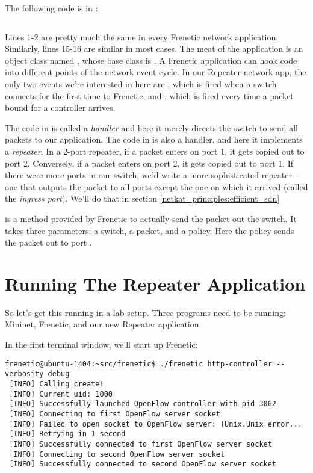 The following code is in :

\inputminted[linenos]{python}{code/quick_start/repeater.py}

Lines 1-2 are pretty much the same in every Frenetic network application.
Similarly, lines 15-16 are similar in most cases. 
 The meat of the application is an object class named , whose base class is .
A Frenetic application can hook code into different points of the network event cycle.
In our Repeater network app, the only two events we're interested in here are
, which is fired when a switch connects for the first time to Frenetic, and 
 , which is fired every time a packet
bound for a controller arrives.

The code in  is called a \emph{handler} and here it 
merely directs the switch to send all packets to our application.
The code in  is also a handler, and here it implements a {\it repeater}.
In a 2-port repeater, if a packet enters on port 1, it gets copied out to port 2.  
Conversely, if a packet enters on port 2, it gets copied out to port 1.
If there were more ports in our switch, we'd write a more sophisticated repeater -- one that
outputs the packet to all ports except the one on which it arrived (called the {\it ingress port}). 
We'll do that in section \ref{netkat_principles:efficient_sdn} 

 is a method provided by Frenetic to actually send the packet out the switch.  It takes three 
parameters: a switch, a packet, and a policy.  
Here the policy sends the packet out to port .   

\section{Running The Repeater Application}

So let's get this running in a lab setup.  
Three programs need to be running:  Mininet, Frenetic, and our new Repeater application.  

In the first terminal window, we'll start up Frenetic:

\begin{verbatim}
frenetic@ubuntu-1404:~src/frenetic$ ./frenetic http-controller --verbosity debug
 [INFO] Calling create!
 [INFO] Current uid: 1000
 [INFO] Successfully launched OpenFlow controller with pid 3062
 [INFO] Connecting to first OpenFlow server socket
 [INFO] Failed to open socket to OpenFlow server: (Unix.Unix_error...
 [INFO] Retrying in 1 second
 [INFO] Successfully connected to first OpenFlow server socket
 [INFO] Connecting to second OpenFlow server socket
 [INFO] Successfully connected to second OpenFlow server socket 
\end{verbatim}

